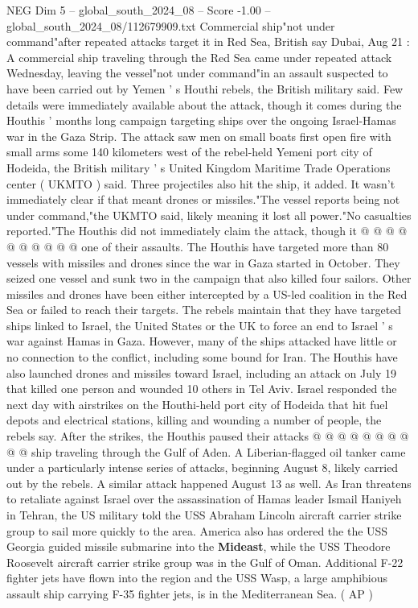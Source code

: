 \begin{textsample}{NEG Dim 5 – global\_south\_2024\_08 – Score -1.00 – global\_south\_2024\_08/112679909.txt}  \label{ex:f5_neg_171}
Commercial ship"not under command"after repeated attacks target it in Red Sea, British say Dubai, Aug 21 : A commercial ship traveling through the Red Sea came under repeated attack Wednesday, leaving the vessel"not under command"in an assault suspected to have been carried out by Yemen ' s Houthi rebels, the British military said.
Few details were immediately available about the attack, though it comes during the Houthis ' months long campaign targeting ships over the ongoing Israel-Hamas war in the Gaza Strip.
The attack saw men on small boats first open fire with small arms some 140 kilometers west of the rebel-held Yemeni port city of Hodeida, the British military ' s United Kingdom Maritime Trade Operations center ( UKMTO ) said.
Three projectiles also hit the ship, it added.
It wasn't immediately clear if that meant drones or missiles."The vessel reports being not under command,"the UKMTO said, likely meaning it lost all power."No casualties reported."The Houthis did not immediately claim the attack, though it @ @ @ @ @ @ @ @ @ @ one of their assaults.
The Houthis have targeted more than 80 vessels with missiles and drones since the war in Gaza started in October.
They seized one vessel and sunk two in the campaign that also killed four sailors.
Other missiles and drones have been either intercepted by a US-led coalition in the Red Sea or failed to reach their targets.
The rebels maintain that they have targeted ships linked to Israel, the United States or the UK to force an end to Israel ' s war against Hamas in Gaza.
However, many of the ships attacked have little or no connection to the conflict, including some bound for Iran.
The Houthis have also launched drones and missiles toward Israel, including an attack on July 19 that killed one person and wounded 10 others in Tel Aviv.
Israel responded the next day with airstrikes on the Houthi-held port city of Hodeida that hit fuel depots and electrical stations, killing and wounding a number of people, the rebels say.
After the strikes, the Houthis paused their attacks @ @ @ @ @ @ @ @ @ @ ship traveling through the Gulf of Aden.
A Liberian-flagged oil tanker came under a particularly intense series of attacks, beginning August 8, likely carried out by the rebels.
A similar attack happened August 13 as well.
As Iran threatens to retaliate against Israel over the assassination of Hamas leader Ismail Haniyeh in Tehran, the US military told the USS Abraham Lincoln aircraft carrier strike group to sail more quickly to the area.
America also has ordered the the USS Georgia guided missile submarine into the \textbf{Mideast}, while the USS Theodore Roosevelt aircraft carrier strike group was in the Gulf of Oman.
Additional F-22 fighter jets have flown into the region and the USS Wasp, a large amphibious assault ship carrying F-35 fighter jets, is in the Mediterranean Sea. ( AP )

\end{textsample}
